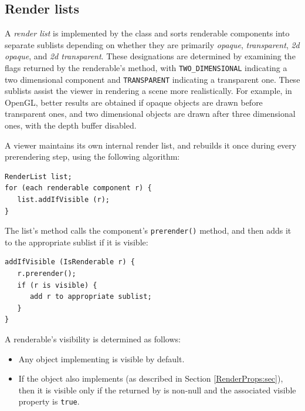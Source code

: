 \subsection{Render lists}
\label{RenderLists:sec}

A {\it render list} is implemented by the class
 and sorts renderable components
into separate sublists depending on whether they are primarily {\it
opaque}, {\it transparent}, {\it 2d opaque}, and {\it 2d transparent}.
These designations are determined by examining the flags returned by
the renderable's
 method,
with {\tt TWO\_DIMENSIONAL} indicating a two dimensional component and
{\tt TRANSPARENT} indicating a transparent one. These sublists assist
the viewer in rendering a scene more realistically.  For example, in
OpenGL, better results are obtained if opaque objects are drawn before
transparent ones, and two dimensional objects are drawn after three
dimensional ones, with the depth buffer disabled.

A viewer maintains its own internal render list, and rebuilds it once
during every prerendering step, using the following algorithm:
%
\begin{lstlisting}[]
RenderList list;
for (each renderable component r) {
   list.addIfVisible (r);
}
\end{lstlisting}
%
The list's 
method calls the component's {\tt prerender()} method, and then adds
it to the appropriate sublist if it is visible:
%
\begin{lstlisting}
addIfVisible (IsRenderable r) {
   r.prerender();
   if (r is visible) {
      add r to appropriate sublist;
   }
}
\end{lstlisting}
%
A renderable's visibility is determined as follows:

\begin{itemize}

\item Any object implementing 
is visible by default.

\item If the object also implements
 (as described in Section
\ref{RenderProps:sec}), then it is visible only if
the  returned by
 is
non-null and the associated {\sf visible} property is {\tt true}.

\end{itemize}

